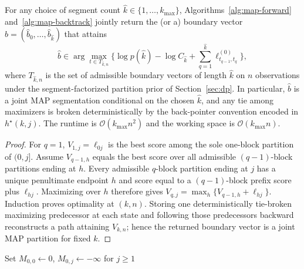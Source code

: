\begin{theorem}
\label{thm:map-correctness}
For any choice of segment count $\widehat k\in\{1,\dots,k_{\max}\}$, Algorithms~\ref{alg:map-forward}
and~\ref{alg:map-backtrack} jointly return the (or a) boundary vector
$\widehat b=(\widehat b_0,\dots,\widehat b_{\widehat k})$ that attains
\[
\widehat b \in \arg\max_{t\in T_{\widehat k,n}}\Big\{
   \log p(\widehat k) - \log C_{\widehat k} + \sum_{q=1}^{\widehat k} \ell^{(0)}_{t_{q-1},t_q}
\Big\},
\]
where $T_{\widehat k,n}$ is the set of admissible boundary vectors of length $\widehat k$ on $n$
observations under the segment-factorized partition prior of Section~\ref{sec:dp}. In particular,
$\widehat b$ is a joint MAP segmentation conditional on the chosen $\widehat k$, and any tie among
maximizers is broken deterministically by the back-pointer convention encoded in
$h^\star(k,j)$. The runtime is $\mathcal{O}(k_{\max}n^2)$ and the working space is
$\mathcal{O}(k_{\max}n)$.
\end{theorem}

\begin{proof}
For $q=1$, $V_{1,j}=\ell_{0j}$ is the best score among the sole one-block partition of $(0,j]$.
Assume $V_{q-1,h}$ equals the best score over all admissible $(q-1)$-block partitions ending at
$h$. Every admissible $q$-block partition ending at $j$ has a unique penultimate endpoint $h$ and
score equal to a $(q-1)$-block prefix score plus $\ell_{hj}$. Maximizing over $h$ therefore gives
$V_{q,j}=\max_h\{V_{q-1,h}+\ell_{hj}\}$. Induction proves optimality at $(k,n)$. Storing one
deterministically tie-broken maximizing predecessor at each state and following those predecessors
backward reconstructs a path attaining $V_{k,n}$; hence the returned boundary vector is a joint MAP
partition for fixed $k$.
\end{proof}


\begin{algorithm}[H]
\caption{MAPForward$(\ell^{(0)}_{ij},k_{\max})$}
\label{alg:map-forward}
\BlankLine
Set $M_{0,0}\leftarrow 0$, $M_{0,j}\leftarrow -\infty$ for $j\ge 1$\;
\end{algorithm}

